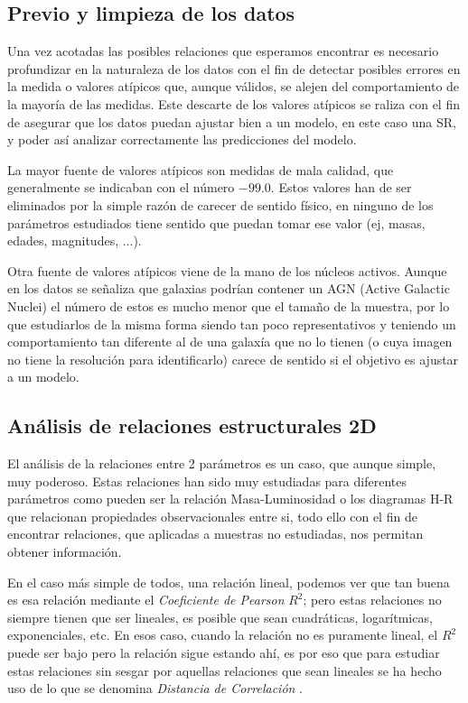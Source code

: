 \documentclass[11pt, a4paper]{article} %
\begin{document}
\subsection{Previo y limpieza de los datos}

Una vez acotadas las posibles relaciones que esperamos encontrar es necesario profundizar en la naturaleza de los datos con 
el fin de detectar posibles errores en la medida o valores atípicos que, aunque válidos, se alejen del comportamiento de la mayoría de las medidas. 
Este descarte de los valores atípicos se raliza con el fin de asegurar que los datos puedan ajustar bien a un modelo, en este caso una SR, y poder así analizar 
correctamente las predicciones del modelo. 

La mayor fuente de valores atípicos son medidas de mala calidad, que generalmente se indicaban con el número $-99.0$. Estos valores han de ser eliminados por la simple razón de carecer de sentido físico, en ninguno de los parámetros estudiados tiene sentido que puedan tomar ese valor (ej, masas, edades, magnitudes, ...). 

Otra fuente de valores atípicos viene de la mano de los núcleos activos. Aunque en los datos se señaliza que galaxias podrían contener un AGN (Active Galactic Nuclei) el número de estos es mucho menor que el tamaño de la muestra, por lo que estudiarlos
de la misma forma siendo tan poco representativos y teniendo un comportamiento tan diferente al de una galaxía que no lo tienen (o cuya imagen no tiene la resolución para identificarlo) carece de sentido si el objetivo es ajustar a un modelo. 

\subsection{Análisis de relaciones estructurales 2D}

El análisis de la relaciones entre 2 parámetros es un caso, que aunque simple, muy poderoso. Estas relaciones han sido muy estudiadas para diferentes parámetros 
como pueden ser la relación Masa-Luminosidad o los diagramas H-R que relacionan propiedades observacionales entre si, todo ello con el fin de encontrar relaciones, que aplicadas a muestras no estudiadas, nos permitan obtener información. 

En el caso más simple de todos, una relación lineal, podemos ver que tan buena es esa relación mediante el \textit{ Coeficiente de Pearson} $R^2$; pero 
estas relaciones no siempre tienen que ser lineales, es posible que sean cuadráticas, logarítmicas, exponenciales, etc. En esos caso, cuando la relación no es puramente lineal, el $R^2$ puede ser bajo
pero la relación sigue estando ahí, es por eso que para estudiar estas relaciones sin sesgar por aquellas relaciones que sean lineales se ha hecho uso de lo que se denomina \textit{Distancia de Correlación} \autocite{dcor}.
\end{document}
